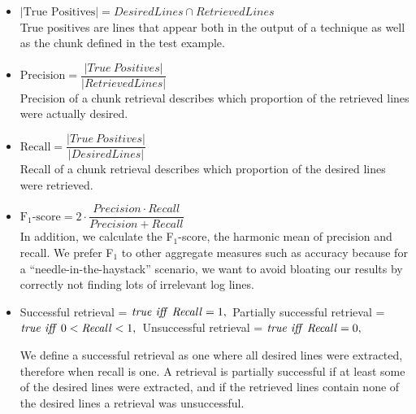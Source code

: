 \vspace{0.2cm}
\begin{itemize}[leftmargin=0.4cm] \itemsep1em
	\item $|\mbox{True\ Positives}| = \mathit{DesiredLines} \cap
	\mathit{RetrievedLines}$ \vspace{0.2cm}\\
	True positives are lines that appear both in the output of a
	technique as well as the chunk defined in the
  test example.


	\item $\mbox{Precision} = \dfrac{|\mathit{True\
	Positives}|}{|\mathit{RetrievedLines}|}$ \vspace{0.21cm} \\
	Precision of a chunk retrieval describes which proportion of
	the retrieved lines were actually desired.

	\item $\mbox{Recall} =
	\dfrac{|\mathit{True\ Positives}|}{|\mathit{DesiredLines}|}$
	\vspace{0.2cm} \\
	Recall of a chunk retrieval describes which proportion of the
	desired lines were retrieved.

	\item $\mbox{F$_{1}$-score} = 2 \cdot \dfrac{\mathit{Precision}
	\cdot \mathit{Recall}}{\mathit{Precision} + \mathit{Recall}}$
	\vspace{0.2cm}\\
	In addition, we calculate the F$_{1}$-score, the harmonic mean
	of precision and recall.
  We prefer F$_{1}$ to other aggregate
	measures such as accuracy because for a
	``needle-in-the-haystack'' scenario, we want to avoid bloating
	our results by correctly not finding lots of irrelevant log
	lines.

	\item Successful retrieval = $\mathit{true}\ \mathit{iff}\
	\mathit{Recall} = 1, \vspace{0.1cm}\\$
	Partially successful retrieval = $\mathit{true}\ \mathit{iff}\
	0<\mathit{Recall}<1, \vspace{0.1cm}\\$
	Unsuccessful retrieval = $\mathit{true}\ \mathit{iff}\
	\mathit{Recall} = 0, \vspace{0.1cm}$

	We define a successful retrieval as one where all desired
	lines were extracted, therefore when recall is one.
	A retrieval is partially successful if at least some of the
	desired lines were extracted,
	and if the retrieved lines contain none of the desired lines
	a retrieval was unsuccessful.
\end{itemize}

